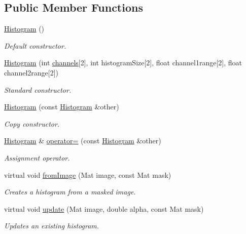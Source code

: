 \subsection*{\-Public \-Member \-Functions}
\begin{DoxyCompactItemize}
\item 
\hyperlink{classHistogram_af681f293852ac145f867ecfcce3062a5}{\-Histogram} ()
\begin{DoxyCompactList}\small\item\em \-Default constructor. \end{DoxyCompactList}\item 
\hyperlink{classHistogram_ab3ba3b109e3a84f5c37cefe0b2b48805}{\-Histogram} (int \hyperlink{classHistogram_a2143ce56ddacb3295a8aa0e3ac8d06f7}{channels}\mbox{[}2\mbox{]}, int histogram\-Size\mbox{[}2\mbox{]}, float channel1range\mbox{[}2\mbox{]}, float channel2range\mbox{[}2\mbox{]})
\begin{DoxyCompactList}\small\item\em \-Standard constructor. \end{DoxyCompactList}\item 
\hyperlink{classHistogram_afed71ab02baa416129ebe375ad07868a}{\-Histogram} (const \hyperlink{classHistogram}{\-Histogram} \&other)
\begin{DoxyCompactList}\small\item\em \-Copy constructor. \end{DoxyCompactList}\item 
\hyperlink{classHistogram}{\-Histogram} \& \hyperlink{classHistogram_aa482e0813acfc907175c8b90ba4d982c}{operator=} (const \hyperlink{classHistogram}{\-Histogram} \&other)
\begin{DoxyCompactList}\small\item\em \-Assignment operator. \end{DoxyCompactList}\item 
virtual void \hyperlink{classHistogram_a1012031886d619600be244dfd2bca6e9}{from\-Image} (\-Mat image, const \-Mat mask)
\begin{DoxyCompactList}\small\item\em \-Creates a histogram from a masked image. \end{DoxyCompactList}\item 
virtual void \hyperlink{classHistogram_abdf2f05d9c70bcdde9e309570e4535cf}{update} (\-Mat image, double alpha, const \-Mat mask)
\begin{DoxyCompactList}\small\item\em \-Updates an existing histogram. \end{DoxyCompactList}\item 

\end{DoxyCompactItemize}
